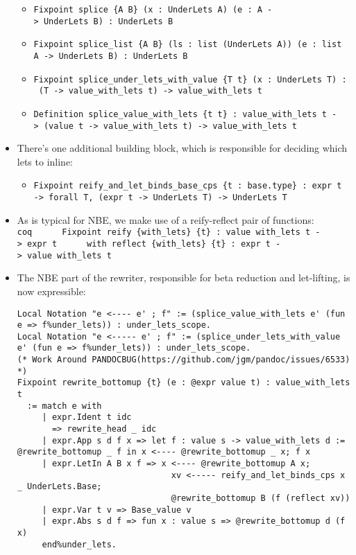 \documentclass[
]{article}
\providecommand{\tightlist}{%
  \setlength{\itemsep}{0pt}\setlength{\parskip}{0pt}}
\begin{document}
\begin{itemize}
  \begin{itemize}
  \tightlist
  \item
    \texttt{Fixpoint\ splice\ \{A\ B\}\ (x\ :\ UnderLets\ A)\ (e\ :\ A\ -\textgreater{}\ UnderLets\ B)\ :\ UnderLets\ B}
  \item
    \texttt{Fixpoint\ splice\_list\ \{A\ B\}\ (ls\ :\ list\ (UnderLets\ A))\ (e\ :\ list\ A\ -\textgreater{}\ UnderLets\ B)\ :\ UnderLets\ B}
  \item
    \texttt{Fixpoint\ splice\_under\_lets\_with\_value\ \{T\ t\}\ (x\ :\ UnderLets\ T)\ :\ (T\ -\textgreater{}\ value\_with\_lets\ t)\ -\textgreater{}\ value\_with\_lets\ t}
  \item
    \texttt{Definition\ splice\_value\_with\_lets\ \{t\ t\textquotesingle{}\}\ :\ value\_with\_lets\ t\ -\textgreater{}\ (value\ t\ -\textgreater{}\ value\_with\_lets\ t\textquotesingle{})\ -\textgreater{}\ value\_with\_lets\ t\textquotesingle{}}
  \end{itemize}
\item
  There's one additional building block, which is responsible for
  deciding which lets to inline:

  \begin{itemize}
  \tightlist
  \item
    \texttt{Fixpoint\ reify\_and\_let\_binds\_base\_cps\ \{t\ :\ base.type\}\ :\ expr\ t\ -\textgreater{}\ forall\ T,\ (expr\ t\ -\textgreater{}\ UnderLets\ T)\ -\textgreater{}\ UnderLets\ T}
  \end{itemize}
\item
  As is typical for NBE, we make use of a reify-reflect pair of
  functions:
  \texttt{coq\ \ \ \ \ \ Fixpoint\ reify\ \{with\_lets\}\ \{t\}\ :\ value\textquotesingle{}\ with\_lets\ t\ -\textgreater{}\ expr\ t\ \ \ \ \ \ with\ reflect\ \{with\_lets\}\ \{t\}\ :\ expr\ t\ -\textgreater{}\ value\textquotesingle{}\ with\_lets\ t}
\item
  The NBE part of the rewriter, responsible for beta reduction and
  let-lifting, is now expressible:

\begin{verbatim}
Local Notation "e <---- e' ; f" := (splice_value_with_lets e' (fun e => f%under_lets)) : under_lets_scope.
Local Notation "e <----- e' ; f" := (splice_under_lets_with_value e' (fun e => f%under_lets)) : under_lets_scope.
(* Work Around PANDOCBUG(https://github.com/jgm/pandoc/issues/6533) *)
Fixpoint rewrite_bottomup {t} (e : @expr value t) : value_with_lets t
  := match e with
     | expr.Ident t idc
       => rewrite_head _ idc
     | expr.App s d f x => let f : value s -> value_with_lets d := @rewrite_bottomup _ f in x <---- @rewrite_bottomup _ x; f x
     | expr.LetIn A B x f => x <---- @rewrite_bottomup A x;
                               xv <----- reify_and_let_binds_cps x _ UnderLets.Base;
                               @rewrite_bottomup B (f (reflect xv))
     | expr.Var t v => Base_value v
     | expr.Abs s d f => fun x : value s => @rewrite_bottomup d (f x)
     end%under_lets.
\end{verbatim}


\end{itemize}
\end{document}
